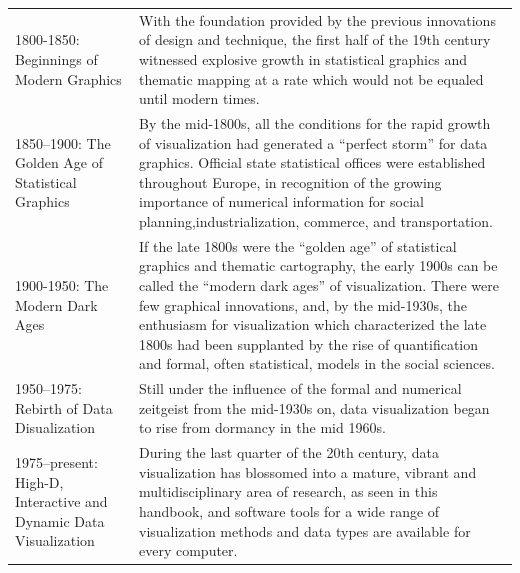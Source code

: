 \documentclass[]{book}
\theoremstyle{definition}
\theoremstyle{definition}
\theoremstyle{definition}
\theoremstyle{remark}
\begin{document}
\begin{longtable}[]{@{}ll@{}}
\begin{minipage}[t]{0.16\columnwidth}
1800-1850: Beginnings of Modern Graphics\strut
\end{minipage} & \begin{minipage}[t]{0.78\columnwidth}\raggedright\strut
With the foundation provided by the previous innovations of design and
technique, the first half of the 19th century witnessed explosive growth
in statistical graphics and thematic mapping at a rate which would not
be equaled until modern times.\strut
\end{minipage}\tabularnewline
\begin{minipage}[t]{0.16\columnwidth}\raggedright\strut
1850--1900: The Golden Age of Statistical Graphics\strut
\end{minipage} & \begin{minipage}[t]{0.78\columnwidth}\raggedright\strut
By the mid-1800s, all the conditions for the rapid growth of
visualization had generated a ``perfect storm'' for data graphics.
Official state statistical offices were established throughout Europe,
in recognition of the growing importance of numerical information for
social planning,industrialization, commerce, and transportation.\strut
\end{minipage}\tabularnewline
\begin{minipage}[t]{0.16\columnwidth}\raggedright\strut
1900-1950: The Modern Dark Ages\strut
\end{minipage} & \begin{minipage}[t]{0.78\columnwidth}\raggedright\strut
If the late 1800s were the ``golden age'' of statistical graphics and
thematic cartography, the early 1900s can be called the ``modern dark
ages'' of visualization. There were few graphical innovations, and, by
the mid-1930s, the enthusiasm for visualization which characterized the
late 1800s had been supplanted by the rise of quantification and formal,
often statistical, models in the social sciences.\strut
\end{minipage}\tabularnewline
\begin{minipage}[t]{0.16\columnwidth}\raggedright\strut
1950--1975: Rebirth of Data Disualization\strut
\end{minipage} & \begin{minipage}[t]{0.78\columnwidth}\raggedright\strut
Still under the influence of the formal and numerical zeitgeist from the
mid-1930s on, data visualization began to rise from dormancy in the mid
1960s.\strut
\end{minipage}\tabularnewline
\begin{minipage}[t]{0.16\columnwidth}\raggedright\strut
1975--present: High-D, Interactive and Dynamic Data Visualization\strut
\end{minipage} & \begin{minipage}[t]{0.78\columnwidth}\raggedright\strut
During the last quarter of the 20th century, data visualization has
blossomed into a mature, vibrant and multidisciplinary area of research,
as seen in this handbook, and software tools for a wide range of
visualization methods and data types are available for every
computer.\strut
\end{minipage}\tabularnewline
\bottomrule
\end{longtable}
\end{document}
